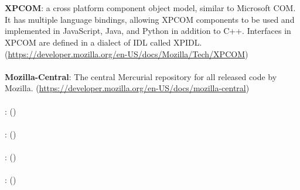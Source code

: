 \documentclass[12pt]{article}
\begin{document}
\\\\
\textbf{XPCOM}: a cross platform component object model, similar to Microsoft COM. It has multiple language bindings, allowing XPCOM components to be used and implemented in JavaScript, Java, and Python in addition to C++. Interfaces in XPCOM are defined in a dialect of IDL called XPIDL. (\href{https://developer.mozilla.org/en-US/docs/Mozilla/Tech/XPCOM}{https://developer.mozilla.org/en-US/docs/Mozilla/Tech/XPCOM})
\\\\
\textbf{Mozilla-Central}: The central Mercurial repository for all released code by Mozilla. (\href{https://developer.mozilla.org/en-US/docs/mozilla-central}{https://developer.mozilla.org/en-US/docs/mozilla-central})
\\\\
\textbf{}: (\href{}{})
\\\\
\textbf{}: (\href{}{})
\\\\
\textbf{}: (\href{}{})
\\\\
\textbf{}: (\href{}{})
\end{document}
